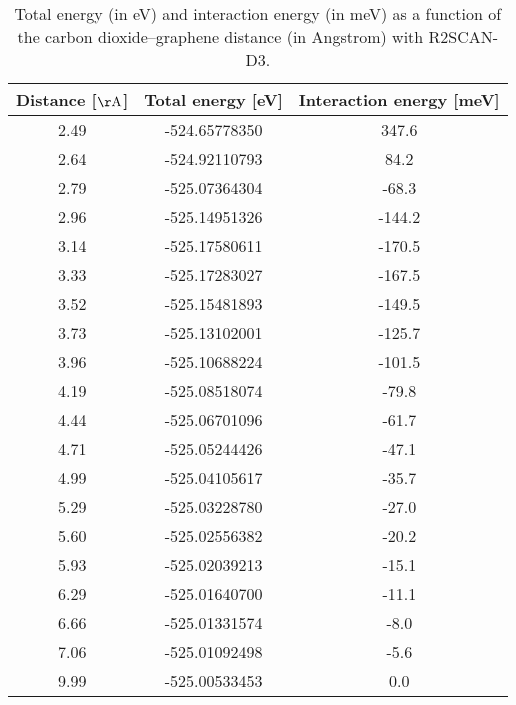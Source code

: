 \begin{table}[h]
\centering
\begin{tabular}{ccc}
\hline
Distance [$\mathrm{\AA}$] & Total energy [eV] & Interaction energy [meV] \\
\hline
2.49 & -524.65778350 & 347.6 \\
2.64 & -524.92110793 & 84.2 \\
2.79 & -525.07364304 & -68.3 \\
2.96 & -525.14951326 & -144.2 \\
3.14 & -525.17580611 & -170.5 \\
3.33 & -525.17283027 & -167.5 \\
3.52 & -525.15481893 & -149.5 \\
3.73 & -525.13102001 & -125.7 \\
3.96 & -525.10688224 & -101.5 \\
4.19 & -525.08518074 & -79.8 \\
4.44 & -525.06701096 & -61.7 \\
4.71 & -525.05244426 & -47.1 \\
4.99 & -525.04105617 & -35.7 \\
5.29 & -525.03228780 & -27.0 \\
5.60 & -525.02556382 & -20.2 \\
5.93 & -525.02039213 & -15.1 \\
6.29 & -525.01640700 & -11.1 \\
6.66 & -525.01331574 & -8.0 \\
7.06 & -525.01092498 & -5.6 \\
9.99 & -525.00533453 & 0.0 \\
\hline
\end{tabular}
\caption{Total energy (in eV) and interaction energy (in meV) as a function of the carbon dioxide--graphene distance (in Angstrom) with R2SCAN-D3.}
\label{SI_dft_table_R2SCAN-D3}
\end{table}